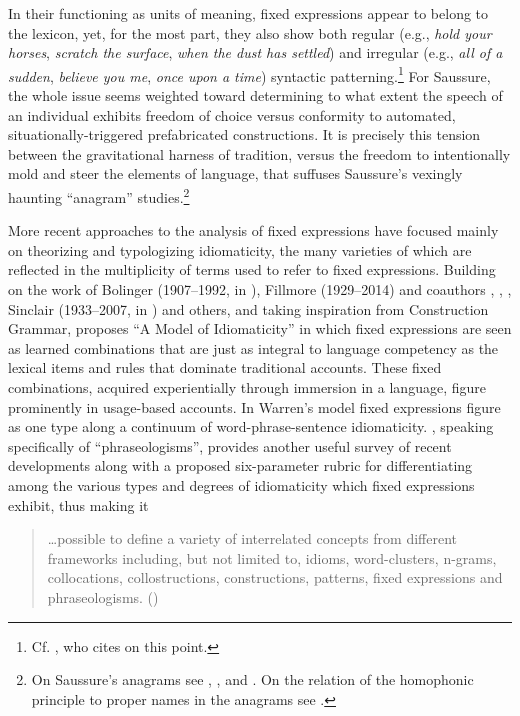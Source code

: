 \documentclass[english,output=paper,colorlinks,citecolor=brown]{../langscibook}
\begin{document}
In their functioning as units of meaning, fixed expressions appear to belong to the lexicon, yet, for the most part, they also show both regular (e.g., \textit{hold your horses}, \textit{scratch the surface}, \textit{when the dust has settled}) and irregular (e.g., \textit{all of a sudden}, \textit{believe you me}, \textit{once upon a time}) syntactic patterning.\footnote{Cf. \citet[2--3]{Wood2002}, who cites \citet[36]{RichardsSchmidt1983} on this point.} For Saussure, the whole issue seems weighted toward determining to what extent the speech of an individual exhibits freedom of choice versus conformity to automated, situationally-triggered prefabricated constructions. It is precisely this tension between the gravitational harness of tradition, versus the freedom to intentionally mold and steer the elements of language, that suffuses Saussure’s vexingly haunting ``anagram'' studies.\footnote{On Saussure’s anagrams see \citealt{GuimaraesBarros2007}, \citeyear{Christy1999Blunder}, and \citeyear{CarrEtAl1999}. On the relation of the homophonic principle to proper names in the anagrams see \citealt{Christy1995}.}

More recent approaches to the analysis of fixed expressions have focused mainly on theorizing and typologizing idiomaticity, the many varieties of which are reflected in the multiplicity of terms used to refer to fixed expressions. Building on the work of Bolinger (1907--1992, in \citeyear{Bolinger1976}), Fillmore (1929--2014) and coauthors \citeyear{FillmoreEtAl1988}, \citet{Makkai1972}, \citet{RichardsSchmidt1983}, Sinclair (1933--2007, in \citeyear{Sinclair1991}) and others, and taking inspiration from Construction Grammar, \citet{Warren2005} proposes “A Model of Idiomaticity” in which fixed expressions are seen as learned combinations that are just as integral to language competency as the lexical items and rules that dominate traditional accounts. These fixed combinations, acquired experientially through immersion in a language, figure prominently in usage-based accounts. In Warren’s model fixed expressions figure as one type along a continuum of word-phrase-sentence idiomaticity. \citet{Gries2008}, speaking specifically of ``phraseologisms'', provides another useful survey of recent developments along with a proposed six-parameter rubric for differentiating among the various types and degrees of idiomaticity which fixed expressions exhibit, thus making it 

\begin{quote}
    …possible to define a variety of interrelated concepts from different frameworks including, but not limited to, idioms, word-clusters, n-grams, collocations, collostructions, constructions, patterns, fixed expressions and phraseologisms. (\citealt[21]{Gries2008})
\end{quote}
\end{document}
